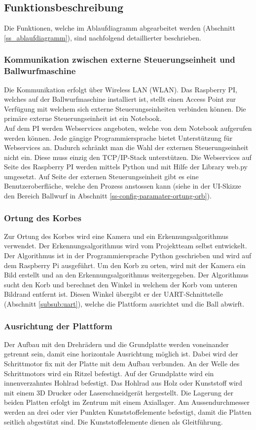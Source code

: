 \subsection{Funktionsbeschreibung}
Die Funktionen, welche im Ablaufdiagramm abgearbeitet werden (Abschnitt \ref{ss_ablaufdiagramm}), sind nachfolgend detaillierter beschrieben.

\subsubsection{Kommunikation zwischen externe Steuerungseinheit und Ballwurfmaschine}
Die Kommunikation erfolgt über Wireless LAN (WLAN). Das Raspberry PI, welches auf der Ballwurfmaschine installiert ist, stellt einen Access Point zur Verfügung mit welchem sich externe Steuerungseinheiten verbinden können. Die primäre externe Steuerungseinheit ist ein Notebook.\\
Auf dem PI werden Webservices angeboten, welche von dem Notebook aufgerufen werden können. Jede gängige Programmiersprache bietet Unterstützung für Webservices an. Dadurch schränkt man die Wahl der externen Steuerungseinheit nicht ein. Diese muss einzig den TCP/IP-Stack unterstützen. Die Webservices auf Seite des Raspberry PI werden mittels Python und mit Hilfe der Library web.py umgesetzt. Auf Seite der externen Steuerungseinheit gibt es eine Benutzeroberfläche, welche den Prozess anstossen kann (siehe in der UI-Skizze den Bereich Ballwurf in Abschnitt
\ref{ss-config-paramater-ortung-orb}).

\subsubsection{Ortung des Korbes}
Zur Ortung des Korbes wird eine Kamera und ein Erkennungsalgorithmus verwendet. Der Erkennungsalgorithmus wird vom Projektteam selbst entwickelt. Der Algorithmus ist in der Programmiersprache Python geschrieben und wird auf dem Raspberry Pi ausgeführt. Um den Korb zu orten, wird mit der Kamera ein Bild erstellt und an den Erkennungsalgorithmus weitergegeben. Der Algorithmus sucht den Korb und berechnet den Winkel in welchem der Korb vom unteren Bildrand entfernt ist. Diesen Winkel übergibt er der UART-Schnittstelle (Abschnitt \ref{subsub:uart}), welche die Plattform ausrichtet und die Ball abwirft.

\subsubsection{Ausrichtung der Plattform}
Der Aufbau mit den Drehrädern und die Grundplatte werden voneinander getrennt sein, damit eine horizontale Ausrichtung möglich ist. Dabei wird der Schrittmotor fix mit der Platte mit dem Aufbau verbunden. An der Welle des Schrittmotors wird ein Ritzel befestigt. Auf der Grundplatte wird ein innenverzahntes Hohlrad befestigt. Das Hohlrad aus Holz oder Kunststoff wird mit einem 3D Drucker oder Laserschneidgerät hergestellt. Die Lagerung der beiden Platten erfolgt im Zentrum mit einem Axiallager. Am Aussendurchmesser werden an drei oder vier Punkten Kunststoffelemente befestigt, damit die Platten seitlich abgestützt sind. Die Kunststoffelemente dienen als Gleitführung.

